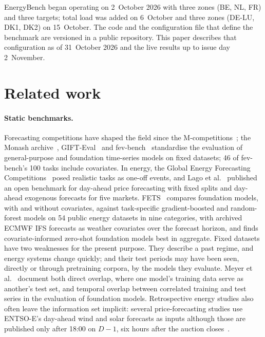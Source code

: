 \documentclass[11pt,a4paper]{article}
\begin{document}
EnergyBench began operating on 2~October 2026 with three zones (BE, NL, FR) and three targets; total load was added on
6~October and three zones (DE-LU, DK1, DK2) on 15~October.
The code and the configuration file that define the benchmark are versioned in a public repository. This paper
describes that configuration as of 31~October 2026 and the live results up to issue day 2~November.

\section{Related work}

\paragraph{Static benchmarks.} Forecasting competitions have shaped the field since the M-competitions~\cite{m4}; the
Monash archive~\cite{monash}, GIFT-Eval~\cite{gifteval} and fev-bench~\cite{fevbench} standardise the evaluation of
general-purpose and foundation time-series models on fixed datasets; 46 of fev-bench's 100 tasks include
covariates. In energy, the Global Energy Forecasting
Competitions~\cite{gefcom} posed realistic tasks as one-off events, and Lago et al.~\cite{lago} published an open
benchmark for day-ahead price forecasting with fixed splits and day-ahead exogenous forecasts for five markets.
FETS~\cite{fets} compares foundation models, with and without covariates, against task-specific gradient-boosted and
random-forest models on 54 public energy datasets in nine categories, with archived ECMWF IFS forecasts as weather
covariates over the forecast horizon, and finds covariate-informed zero-shot foundation models best in aggregate. Fixed
datasets have two weaknesses for the present purpose. They describe a past regime, and energy systems change quickly;
and their test periods may have been seen, directly or through pretraining corpora, by the models they evaluate.
Meyer et al.~\cite{meyerleak} document both direct overlap, where one model's training data serve as another's test
set, and temporal overlap between correlated training and test series in the evaluation of foundation models.
Retrospective energy studies also often leave the information set implicit: several price-forecasting studies use
ENTSO-E's day-ahead wind and solar forecasts as inputs although those are published only after 18:00 on $D-1$, six
hours after the auction closes~\cite{energyarena}.
\end{document}
